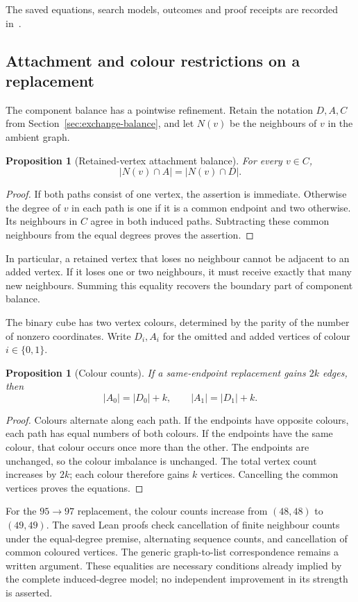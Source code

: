 \documentclass[11pt,a4paper]{article}
\newtheorem{proposition}[theorem]{Proposition}
\theoremstyle{definition}
\theoremstyle{remark}
\begin{document}
The saved equations, search models, outcomes and proof receipts are
recorded in~\cite{exchange190archive}.



\subsection{Attachment and colour restrictions on a replacement}
\label{sec:attachment-colour}
The component balance has a pointwise refinement. Retain the notation
$D,A,C$ from Section~\ref{sec:exchange-balance}, and let $N(v)$ be the
neighbours of $v$ in the ambient graph.

\begin{proposition}[Retained-vertex attachment balance]
For every $v\in C$,
\[
|N(v)\cap A|=|N(v)\cap D|.
\]
\end{proposition}
\begin{proof}
If both paths consist of one vertex, the assertion is immediate.
Otherwise the degree of $v$ in each path is one if it is a common endpoint and
two otherwise. Its neighbours in $C$ agree in both induced paths.
Subtracting these common neighbours from the equal degrees proves
the assertion.
\end{proof}
In particular, a retained vertex that loses no neighbour cannot be
adjacent to an added vertex. If it loses one or two neighbours, it
must receive exactly that many new neighbours. Summing this equality
recovers the boundary part of component balance.

The binary cube has two vertex colours, determined by the parity of
the number of nonzero coordinates. Write $D_i,A_i$ for the omitted
and added vertices of colour $i\in\{0,1\}$.
\begin{proposition}[Colour counts]
If a same-endpoint replacement gains $2k$ edges, then
\[
|A_0|=|D_0|+k,\qquad |A_1|=|D_1|+k.
\]
\end{proposition}
\begin{proof}
Colours alternate along each path. If the endpoints have opposite
colours, each path has equal numbers of both colours. If the endpoints
have the same colour, that colour occurs once more than the other.
The endpoints are unchanged, so the colour imbalance is unchanged.
The total vertex count increases by $2k$; each colour therefore gains
$k$ vertices. Cancelling the common vertices proves the equations.
\end{proof}
For the $95\to97$ replacement, the colour counts increase from
$(48,48)$ to $(49,49)$. The saved Lean proofs check cancellation of
finite neighbour counts under the equal-degree premise, alternating
sequence counts, and cancellation of common coloured vertices.
The generic graph-to-list correspondence remains a written argument.
These equalities are necessary conditions already implied by the
complete induced-degree model; no independent improvement in its
strength is asserted.
\end{document}
